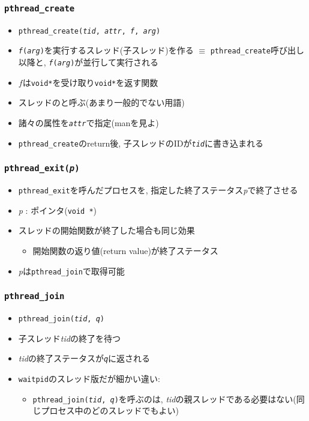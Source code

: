 \documentclass[12pt,dvipdfmx]{beamer}
\begin{document}
\begin{frame}[fragile]
\frametitle{{\tt pthread\_create}}
\begin{itemize}
\item {\tt pthread\_create({\it tid}, {\it attr}, {\it f}, {\it arg})}
\item {\tt {\it f}({\it arg})}を実行するスレッド(子スレッド)を作る
  $\equiv$ {\tt pthread\_create}呼び出し以降と,
  {\tt {\it f}({\it arg})}が並行して実行される
\item $f$は{\tt void*}を受け取り{\tt void*}を返す関数
\item スレッドのと呼ぶ(あまり一般的でない用語)
\item 諸々の属性を{\tt {\it attr}}で指定(manを見よ)
\item {\tt pthread\_create}のreturn後,
  子スレッドのIDが{\tt *{\it tid}}に書き込まれる
\end{itemize}
\end{frame}

\begin{frame}[fragile]
\frametitle{{\tt pthread\_exit({\it p})}}
\begin{itemize}
\item {\tt pthread\_exit}を呼んだプロセスを,
  指定した終了ステータス{\it p}で終了させる
\item {\it p} : ポインタ({\tt void *})
\item スレッドの開始関数が終了した場合も同じ効果
  \begin{itemize}
  \item 開始関数の返り値(return value)が終了ステータス
  \end{itemize}
\item {\it p}は{\tt pthread\_join}で取得可能
\end{itemize}
\end{frame}

\begin{frame}[fragile]
  \frametitle{{\tt pthread\_join}}
  \begin{itemize}
  \item {\tt pthread\_join({\it tid}, {\it q})}
  \item 子スレッド{\it tid}の終了を待つ
  \item {\it tid}の終了ステータスが{\tt *{\it q}}に返される
  \item {\tt waitpid}のスレッド版だが細かい違い:
    \begin{itemize}
    \item {\tt pthread\_join({\it tid}, {\it q})}を呼ぶのは,
      {\it tid}の親スレッドである必要はない(同じプロセス中のどのスレッドでもよい)
    \end{itemize}
  \end{itemize}
\end{frame}
\end{document}
